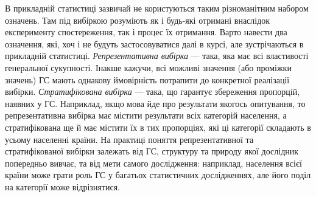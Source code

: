 \begin{remark}
    В прикладній статистиці зазвичай не користуються таким різноманітним набором означень. Там під вибіркою розуміють як і будь-які 
    отримані внаслідок експерименту спостереження, так і процес їх отримання. Варто навести два означення, які, хоч і не будуть застосовуватися далі
    в курсі, але зустрічаються в прикладній статистиці. \emph{Репрезентативна вибірка} --- така, яка має всі властивості генеральної сукупності. Інакше кажучи, всі можливі значення 
    (або проміжки значень) ГС мають однакову ймовірність потрапити до конкретної реалізації вибірки.
    \emph{Стратифікована вибірка} --- така, що гарантує збереження пропорцій, наявних у ГС.
    Наприклад, якщо мова йде про результати якогось опитування, то репрезентативна вибірка має містити результати всіх категорій населення, а 
    стратифікована ще й має містити їх в тих пропорціях, які ці категорії складають в усьому населенні країни.
    На практиці поняття репрезентативної та стратифікованої вибірки залежать від ГС, структуру та природу якої дослідник попередньо вивчає,
    та від мети самого дослідження: наприклад, населення всієї країни може грати роль ГС у багатьох статистичних дослідженнях, 
    але його поділ на категорії може відрізнятися.
\end{remark}
